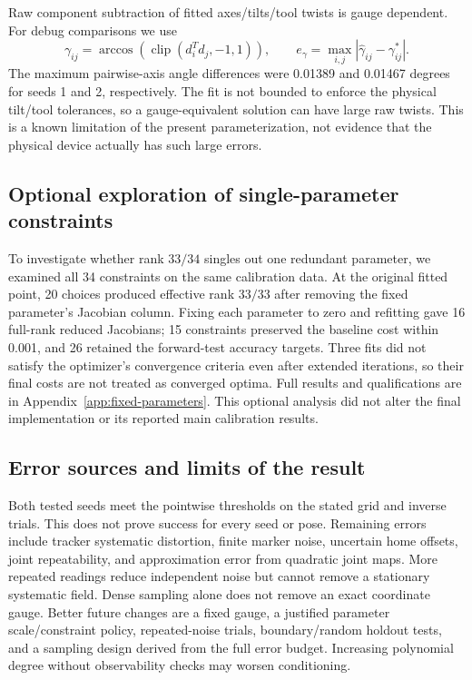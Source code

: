 \documentclass[11pt]{article}
\begin{document}
Raw component subtraction of fitted axes/tilts/tool twists is gauge dependent. For debug comparisons we use
\begin{equation}
 \gamma_{ij}=\arccos\!\left(\operatorname{clip}(d_i^Td_j,-1,1)\right),\qquad
 e_\gamma=\max_{i,j}|\widehat\gamma_{ij}-\gamma_{ij}^{*}|.
\end{equation}
The maximum pairwise-axis angle differences were 0.01389 and 0.01467 degrees for seeds 1 and 2, respectively. The fit is not bounded to enforce the physical tilt/tool tolerances, so a gauge-equivalent solution can have large raw twists. This is a known limitation of the present parameterization, not evidence that the physical device actually has such large errors.

\subsection{Optional exploration of single-parameter constraints}
To investigate whether rank $33/34$ singles out one redundant parameter, we examined all 34 constraints on the same calibration data. At the original fitted point, 20 choices produced effective rank $33/33$ after removing the fixed parameter's Jacobian column. Fixing each parameter to zero and refitting gave 16 full-rank reduced Jacobians; 15 constraints preserved the baseline cost within 0.001, and 26 retained the forward-test accuracy targets. Three fits did not satisfy the optimizer's convergence criteria even after extended iterations, so their final costs are not treated as converged optima. Full results and qualifications are in Appendix~\ref{app:fixed-parameters}. This optional analysis did not alter the final implementation or its reported main calibration results.

\subsection{Error sources and limits of the result}
Both tested seeds meet the pointwise thresholds on the stated grid and inverse trials. This does not prove success for every seed or pose. Remaining errors include tracker systematic distortion, finite marker noise, uncertain home offsets, joint repeatability, and approximation error from quadratic joint maps. More repeated readings reduce independent noise but cannot remove a stationary systematic field. Dense sampling alone does not remove an exact coordinate gauge. Better future changes are a fixed gauge, a justified parameter scale/constraint policy, repeated-noise trials, boundary/random holdout tests, and a sampling design derived from the full error budget. Increasing polynomial degree without observability checks may worsen conditioning.
\end{document}
